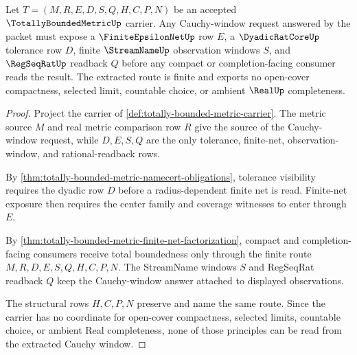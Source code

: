 \begin{theorem}
\label{thm:totally-bounded-metric-cauchy-window}
Let $T=(M,R,E,D,S,Q,H,C,P,N)$ be an accepted $\TotallyBoundedMetricUp$ carrier. Any Cauchy-window request answered by the packet must expose a $\FiniteEpsilonNetUp$ row $E$, a $\DyadicRatCoreUp$ tolerance row $D$, finite $\StreamNameUp$ observation windows $S$, and $\RegSeqRatUp$ readback $Q$ before any compact or completion-facing consumer reads the result. The extracted route is finite and exports no open-cover compactness, selected limit, countable choice, or ambient $\RealUp$ completeness.
\end{theorem}
\begin{proof}
Project the carrier of \autoref{def:totally-bounded-metric-carrier}. The metric source $M$ and real metric comparison row $R$ give the source of the Cauchy-window request, while $D,E,S,Q$ are the only tolerance, finite-net, observation-window, and rational-readback rows.

By \autoref{thm:totally-bounded-metric-namecert-obligations}, tolerance visibility requires the dyadic row $D$ before a radius-dependent finite net is read. Finite-net exposure then requires the center family and coverage witnesses to enter through $E$.

By \autoref{thm:totally-bounded-metric-finite-net-factorization}, compact and completion-facing consumers receive total boundedness only through the finite route $M,R,D,E,S,Q,H,C,P,N$. The StreamName windows $S$ and RegSeqRat readback $Q$ keep the Cauchy-window answer attached to displayed observations.

The structural rows $H,C,P,N$ preserve and name the same route. Since the carrier has no coordinate for open-cover compactness, selected limits, countable choice, or ambient Real completeness, none of those principles can be read from the extracted Cauchy window.
\end{proof}


